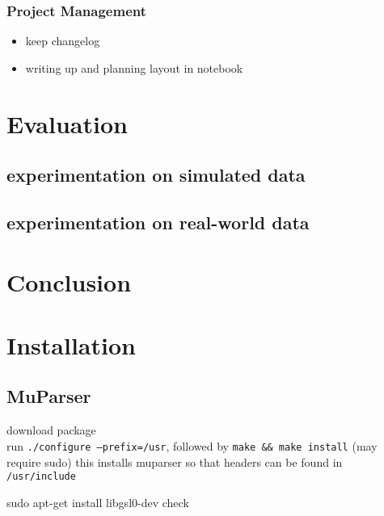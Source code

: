 \documentclass[a4paper,11pt]{article}
\begin{document}
\subsubsection{Project Management}
\label{sec-6-2-3}

\begin{itemize}
\item keep changelog
\item writing up and planning layout in notebook
\end{itemize}
\section{Evaluation}
\label{sec-7}
\subsection{experimentation on simulated data}
\label{sec-7-1}
\subsection{experimentation on real-world data}
\label{sec-7-2}
\section{Conclusion}
\label{sec-8}

\newpage
\nocite{*}
\printbibliography
\newpage
\section{Installation}
\label{sec-9}
\subsection{MuParser}
\label{sec-9-1}

 download package\\
 run \texttt{./configure --prefix=/usr}, followed by \texttt{make \&\& make install} (may require sudo)
 this installs muparser so that headers can be found in \texttt{/usr/include}
    
    sudo apt-get install libgsl0-dev check 
\end{document}
